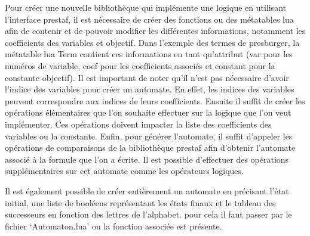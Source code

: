 Pour créer une nouvelle bibliothèque qui implémente une logique en utilisant l’interface prestaf, il est nécessaire de créer des fonctions ou des métatables lua afin de contenir et de pouvoir modifier les différentes informations, notamment les coefficients des variables et objectif. Dans l’exemple des termes de presburger, la métatable lua Term contient ces informations en tant qu’attribut (var pour les numéros de variable, coef pour les coefficients associés et constant pour la constante objectif).
Il est important de noter qu’il n’est pas nécessaire d’avoir l’indice des variables pour créer un automate. En effet, les indices des variables peuvent correspondre aux indices de leurs coefficients.
Ensuite il suffit de créer les opérations élémentaires que l’on souhaite effectuer sur la logique que l’on veut implémenter. Ces opérations doivent impacter la liste des coefficients des variables ou la constante.
Enfin, pour générer l’automate, il suffit d’appeler les opérations de comparaisons de la bibliothèque prestaf afin d’obtenir l’automate associé à la formule que l’on a écrite. Il est possible d’effectuer des opérations supplémentaires sur cet automate comme les opérateurs logiques.

Il est également possible de créer entièrement un automate en précisant l’état initial, une liste de booléens représentant les états finaux et le tableau des successeurs en fonction des lettres de l’alphabet. pour cela il faut passer par le fichier ‘Automaton.lua’ ou la fonction associée est présente.
